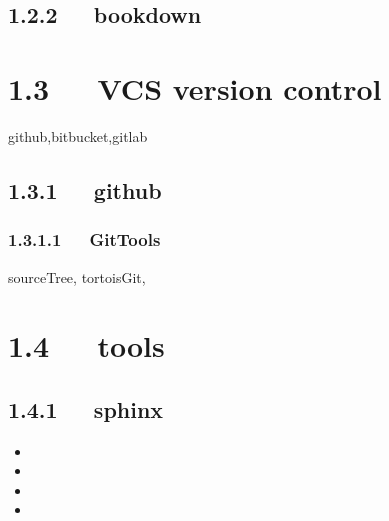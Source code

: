\documentclass[letterpaper,12pt,english]{sphinxmanual}
\begin{document}
\subsection{1.2.2   bookdown}
\label{\detokenize{001software/001install/001._u7f51_u7ad9/_u7f51_u7ad9_u8d44_u6e90_u7ad9_u70b9:bookdown}}


\section{1.3   VCS version control}
\label{\detokenize{001software/001install/001._u7f51_u7ad9/_u7f51_u7ad9_u8d44_u6e90_u7ad9_u70b9:vcs-version-control}}
github,bitbucket,gitlab


\subsection{1.3.1   github}
\label{\detokenize{001software/001install/001._u7f51_u7ad9/_u7f51_u7ad9_u8d44_u6e90_u7ad9_u70b9:github}}


\subsubsection{1.3.1.1   GitTools}
\label{\detokenize{001software/001install/001._u7f51_u7ad9/_u7f51_u7ad9_u8d44_u6e90_u7ad9_u70b9:gittools}}
sourceTree, tortoisGit,


\section{1.4   tools}
\label{\detokenize{001software/001install/001._u7f51_u7ad9/_u7f51_u7ad9_u8d44_u6e90_u7ad9_u70b9:tools}}

\subsection{1.4.1   sphinx}
\label{\detokenize{001software/001install/001._u7f51_u7ad9/_u7f51_u7ad9_u8d44_u6e90_u7ad9_u70b9:sphinx}}\begin{itemize}
\item {} 

\item {} 

\item {} 

\item {} 

\end{itemize}
\end{document}
